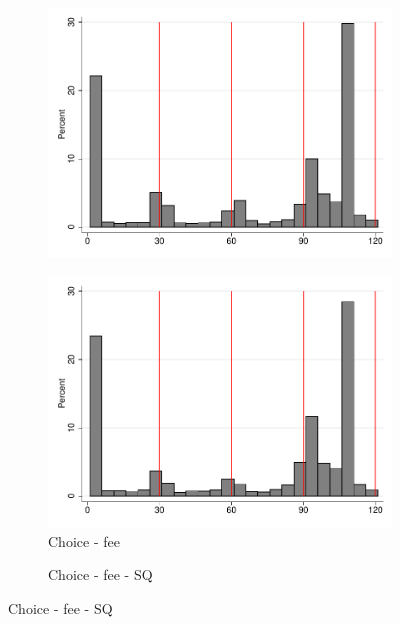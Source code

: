 \documentclass[11pt]{article}
\begin{document}
\begin{figure}[H]
\begin{center}
\begin{subfigure}{.31\textwidth}
        \centering
        \includegraphics[width=\textwidth]{Figuras/hist_payments_pro_3.pdf}
    \end{subfigure}  
     \begin{subfigure}{.31\textwidth}
    \caption{Choice - fee}
        \centering
        \includegraphics[width=\textwidth]{Figuras/hist_payments_pro_4.pdf}
    \end{subfigure}  
     \begin{subfigure}{.31\textwidth}
    \caption{Choice - fee - SQ}
        \centering

\end{subfigure}
\end{center}
\end{figure}
\end{document}
